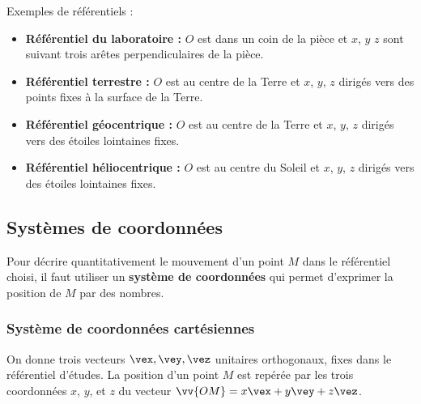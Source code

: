 \documentclass{cours}
\begin{document}
Exemples de référentiels :
\begin{itemize}
  \item \textbf{Référentiel du laboratoire : }$O$ est dans un coin de la pièce et $x$, $y$ $z$ sont suivant trois arêtes perpendiculaires de la pièce.
  \item \textbf{Référentiel terrestre : } $O$ est au centre de la Terre et $x$, $y$, $z$ dirigés vers des points fixes à la surface de la Terre.
  \item \textbf{Référentiel géocentrique : } $O$ est au centre de la Terre et $x$, $y$, $z$ dirigés vers des étoiles lointaines fixes.
  \item \textbf{Référentiel héliocentrique : } $O$ est au centre du Soleil et $x$, $y$, $z$ dirigés vers des étoiles lointaines fixes.
\end{itemize}

\subsection{Systèmes de coordonnées}%
\label{sub:systemes_de_coordonnees}
Pour décrire quantitativement le mouvement d'un point $M$ dans le référentiel choisi, il faut utiliser un \textbf{système de coordonnées} qui permet d'exprimer la position de $M$ par des nombres. 

\subsubsection{Système de coordonnées cartésiennes}%
\label{ssub:systeme_de_coordonnees_cartesiennes}

On donne trois vecteurs $\vex, \vey, \vez$ unitaires orthogonaux, fixes dans le référentiel d'études. La position d'un point $M$ est repérée par les trois coordonnées $x$, $y$, et $z$ du vecteur $\vv{OM} = x \vex + y \vey  + z \vez$.   
\end{document}
